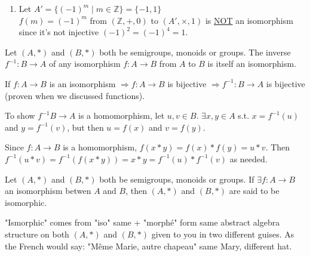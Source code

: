 \documentclass[10pt]{article}
\begin{document}
\begin{description}
\begin{enumerate}
			\item Let $A' = \{(-1)^m \mid m \in \mathbb{Z} \} = \{-1, 1\}$ \\
			$f(m) = (-1)^m$ from $(\mathbb{Z}, +, 0)$ to $(A', \times, 1)$ is \underline{NOT} an isomorphism since it's not injective $(-1)^2 = (-1)^4 = 1$.
		\end{enumerate}
		\item[Theorem:] Let $(A, *)$ and $(B, *)$ both be semigroups, monoids or groups. The inverse $f^{-1}: B \rightarrow A$ of any isomorphism  $f: A \rightarrow B$ from $A$ to $B$ is itself an isomorphism.
		\item[Proof:] If $f: A \rightarrow B$ is an isomorphism $\Rightarrow f:A \rightarrow B$ is bijective $\Rightarrow f^{-1}:B \rightarrow A$ is bijective (proven when we discussed functions).
		\item To show $f^{-1} B \rightarrow A$ is a homomorphism, let $u, v \in B$. $\exists x, y \in A$ s.t. $x = f^{-1}(u)$ and $y = f^{-1}(v)$, but then $u = f(x)$ and $v = f(y)$.
		\item Since $f: A \rightarrow B$ is a homomorphism, $f(x * y) = f(x) * f(y) = u*v$. Then $f^{-1}(u*v) = f^{-1}(f(x*y)) = x*y = f^{-1}(u)*f^{-1}(v)$ as needed.
		\item[qed]
		\item[Definition:] Let $(A, *)$ and $(B, *)$ both be semigroups, monoids or groups. If $\exists f:A \rightarrow B$ an isomorphism betwen $A$ and $B$, then $(A, *)$ and $(B, *)$ are said to be isomorphic.
		\item[Remark:] "Ismorphic" comes from "iso" same + "morph\'{e}" form same abstract algebra structure on both $(A, *)$ and $(B, *)$ given to you in two different guises. As the French would say: "M\^{e}me Marie, autre chapeau" same Mary, different hat.
	\end{description}
	
\end{document}
